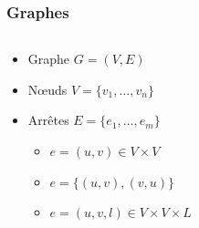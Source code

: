 \documentclass[c]{beamer}
\begin{document}
\begin{frame}
    \frametitle{Graphes}

    \begin{columns}
        \begin{column}{.5\textwidth}
            \begin{itemize}
                \item<1-> Graphe $G = (V,E)$
                \item<2-> N\oe{}uds $V = \{v_1,\ldots,v_n\}$
                \item<3-> Arrêtes $E = \{e_1,\ldots,e_m\}$
                    \begin{itemize}
                        \item<4-> $e = (u,v) \in V \times V$
                        \item<5-> $e = \{(u,v), (v,u)\}$
                        \item<6-> $e = (u,v,l) \in V \times V \times L$
                    \end{itemize}
            \end{itemize}
        \end{column}
        \begin{column}{.5\textwidth}
\end{column}
\end{columns}
\end{frame}
\end{document}
